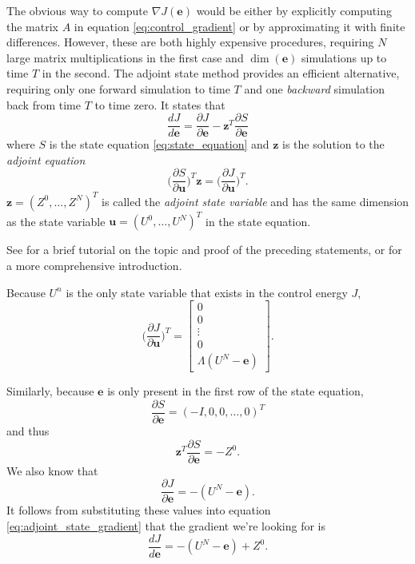 \documentclass[utf8,english]{gradu3}
\begin{document}
The obvious way to compute $\nabla J(\mathbf{e})$ would be either by
explicitly computing the matrix $A$ in equation \eqref{eq:control_gradient}
or by approximating it with finite differences.
However, these are both highly expensive procedures,
requiring $N$ large matrix multiplications in the first case
and $\dim(\mathbf{e})$ simulations up to time $T$ in the second.
The adjoint state method provides an efficient alternative,
requiring only one forward simulation to time $T$
and one \textit{backward} simulation back from time $T$ to time zero.
It states that
\begin{equation}\label{eq:adjoint_state_gradient}
  \frac{dJ}{d\mathbf{e}}
  = \frac{\partial J}{\partial \mathbf{e}}
  - \mathbf{z}^T \frac{\partial S}{\partial \mathbf{e}}
\end{equation}
where $S$ is the state equation \eqref{eq:state_equation}
and $\mathbf{z}$ is the solution to the \textit{adjoint equation}
\begin{equation}\label{eq:adjoint_equation}
  \Big(\frac{\partial S}{\partial \mathbf{u}}\Big)^T \mathbf{z}
  = \Big(\frac{\partial J}{\partial \mathbf{u}}\Big)^T.
\end{equation}
$\mathbf{z} = (Z^0, \dots, Z^N)^T$ is called the \textit{adjoint state variable}
and has the same dimension as the state variable
$\mathbf{u} = (U^0, \dots, U^N)^T$ in the state equation.

See \parencite{bradley_pde-constrained_2019} for a brief tutorial on the topic
and proof of the preceding statements, or \parencite{givoli_tutorial_2021}
for a more comprehensive introduction.

Because $U^n$ is the only state variable that exists in the control energy $J$,
\[
  \Big(\frac{\partial J}{\partial \mathbf{u}}\Big)^T = \begin{bmatrix}
    0 \\ 0 \\ \vdots \\ 0 \\ \Lambda(U^N - \mathbf{e})
  \end{bmatrix}.
\]

Similarly, because $\mathbf{e}$ is only present in the first row
of the state equation,
\[
  \frac{\partial S}{\partial \mathbf{e}} = (-I, 0, 0, \dots, 0)^T
\]
and thus 
\[
  \mathbf{z}^T \frac{\partial S}{\partial \mathbf{e}} = -Z^0.
\]
We also know that
\[
  \frac{\partial J}{\partial \mathbf{e}} = -(U^N - \mathbf{e}).
\]
It follows from substituting these values into equation \eqref{eq:adjoint_state_gradient}
that the gradient we're looking for is
\begin{equation}\label{eq:adjoint_solution}
  \frac{dJ}{d\mathbf{e}} = -(U^N - \mathbf{e}) + Z^0.
\end{equation}
\end{document}
